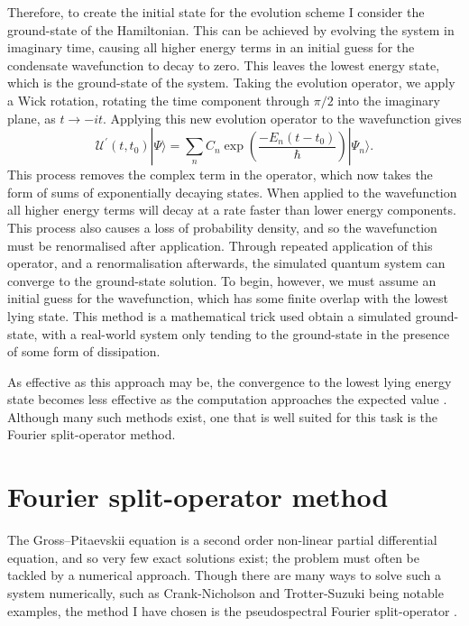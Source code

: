 Therefore, to create the initial state for the evolution scheme I consider the ground-state of the Hamiltonian. This can be achieved by evolving the system in imaginary time, causing all higher energy terms in an initial guess for the condensate wavefunction to decay to zero. This leaves the lowest energy state, which is the ground-state of the system. Taking the evolution operator, we apply a Wick rotation, rotating the time component through $\pi/2$ into the imaginary plane, as $t \rightarrow -it$. Applying this new evolution operator to the wavefunction gives
\begin{equation}
       \mathscr{U^{'}}(t,t_0)|\Psi \rangle = \displaystyle\sum\limits_{n} C_n \exp\left(\frac{-{E_n}(t-t_0)}{\hbar}\right)|\Psi_n \rangle.
\end{equation}
This process removes the complex term in the operator, which now takes the form of sums of exponentially decaying states. When applied to the wavefunction all higher energy terms will decay at a rate faster than lower energy components. This process also causes a loss of probability density, and so the wavefunction must be renormalised after application. Through repeated application of this operator, and a renormalisation afterwards, the simulated quantum system can converge to the ground-state solution. To begin, however, we must assume an initial guess for the wavefunction, which has some finite overlap with the lowest lying state. This method is a mathematical trick used obtain a simulated ground-state, with a real-world system only tending to the ground-state in the presence of some form of dissipation.

As effective as this approach may be, the convergence to the lowest lying energy state becomes less effective as the computation approaches the expected value \cite{Vtx:Danaila_pra_2005}. Although many such methods exist, one that is well suited for this task is the Fourier split-operator method.

\section{Fourier split-operator method}\label{sec:numerics}
The Gross--Pitaevskii equation is a second order non-linear partial differential equation, and so very few exact solutions exist; the problem must often be tackled by a numerical approach. Though there are many ways to solve such a system numerically, such as Crank-Nicholson and Trotter-Suzuki being notable examples, the method I have chosen is the pseudospectral Fourier split-operator \cite{Num:Bauke_cpc_2011}.

